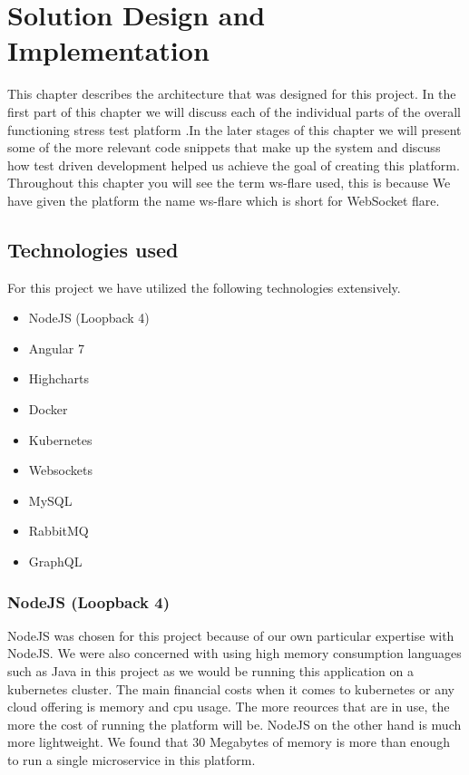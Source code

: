 \chapter{Solution Design and Implementation}

This chapter describes the architecture that was designed for this project. In the first part of this chapter we will discuss each of the individual parts of the overall functioning stress test platform .In the later stages of this chapter we will present some of the more relevant code snippets that make up the system and discuss how test driven development helped us achieve the goal of creating this platform. Throughout this chapter you will see the term ws-flare used, this is because We have given the platform the name ws-flare which is short for WebSocket flare.

\section{Technologies used}

For this project we have utilized the following technologies extensively.

\begin{itemize}
  \item NodeJS (Loopback 4)
  \item Angular 7
  \item Highcharts
  \item Docker
  \item Kubernetes
  \item Websockets
  \item MySQL
  \item RabbitMQ
  \item GraphQL
\end{itemize}

\subsection{NodeJS (Loopback 4)}

NodeJS was chosen for this project because of our own particular expertise with NodeJS. We were also concerned with using high memory consumption languages such as Java in this project as we would be running this application on a kubernetes cluster. The main financial costs when it comes to kubernetes or any cloud offering is memory and cpu usage. The more reources that are in use, the more the cost of running the platform will be. NodeJS on the other hand is much more lightweight. We found that 30 Megabytes of memory is more than enough to run a single microservice in this platform. 


